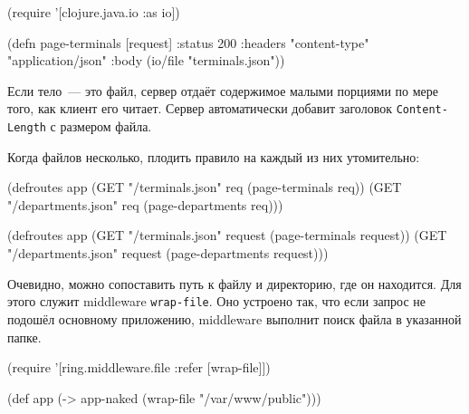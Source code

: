\else

\begin{english}
  \begin{clojure}
(require '[clojure.java.io :as io])

(defn page-terminals
  [request]
  {:status 200
   :headers {"content-type" "application/json"}
   :body (io/file "terminals.json")})
  \end{clojure}
\end{english}

\fi


Если тело~--- это файл, сервер отдаёт содержимое малыми порциями по мере того, как
клиент его читает. Сервер автоматически добавит заголовок
\verb|Content-Length| с размером файла.

Когда файлов несколько, плодить правило на каждый из них утомительно:

\ifx\DEVICETYPE\MOBILE

\begin{english}
  \begin{clojure}
(defroutes app
  (GET "/terminals.json"
       req (page-terminals req))
  (GET "/departments.json"
       req (page-departments req)))
  \end{clojure}
\end{english}

\else

\begin{english}
  \begin{clojure}
(defroutes app
  (GET "/terminals.json"   request (page-terminals request))
  (GET "/departments.json" request (page-departments request)))
  \end{clojure}
\end{english}

\fi


Очевидно, можно сопоставить путь к файлу и директорию, где он находится. Для
этого служит middleware \verb|wrap-file|. Оно устроено так, что если запрос не
подошёл основному приложению, middleware выполнит поиск файла в указанной папке.

\ifx\DEVICETYPE\MOBILE

\begin{english}
  \begin{clojure}
(require '[ring.middleware.file
           :refer [wrap-file]])

(def app
  (-> app-naked
      (wrap-file "/var/www/public")))
  \end{clojure}
\end{english}

